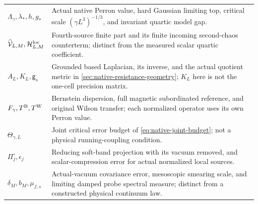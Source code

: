 \documentclass[11pt,oneside,openany]{book}
\theoremstyle{definition}
\theoremstyle{remark}
\begin{document}
\begin{longtable}{L{0.23\textwidth}L{0.70\textwidth}}
$\Lambda_\gamma,\lambda_*,h,g_*$ & Actual native Perron value, hard Gaussian limiting top, critical scale $(\gamma L^3)^{-1/3}$, and invariant quartic model gap. \\
$\widehat{\mathcal V}_{L,M},\mathcal H^{\rm loc}_{L,M}$ & Fourth-source finite part and its finite incoming second-chaos counterterm; distinct from the measured scalar quartic coefficient. \\
$A_L,K_L,\mathsf g_s$ & Grounded based Laplacian, its inverse, and the actual quotient metric in \cref{sec:native-resistance-geometry}; $K_L$ here is not the one-cell precision matrix. \\
$F_\gamma,T^{\rm B},T^{\rm W}$ & Bernstein dispersion, full magnetic subordinated reference, and original Wilson transfer; each normalized operator uses its own Perron value. \\
$\Theta_{\gamma,L}$ & Joint critical error budget of \cref{eq:native-joint-budget}; not a physical running-coupling condition. \\
$\Pi_j^\circ,\epsilon_j$ & Reducing soft-band projection with its vacuum removed, and scalar-compression error for actual normalized local sources. \\
$\delta_M,b_M,\mu_{f,s}$ & Actual-vacuum covariance error, mesoscopic smearing scale, and limiting damped probe spectral measure; distinct from a constructed physical continuum law. \\
\bottomrule
\end{longtable}
\end{document}
